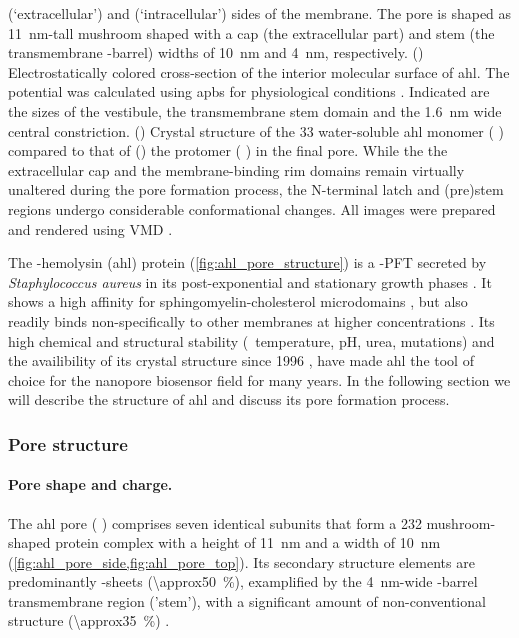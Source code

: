 \begin{figure*}[p]
{  \cisi{}  (`extracellular') and \transi{} (`intracellular') sides of the membrane. The pore is shaped as
  \SI{11}{\nm}-tall mushroom shaped with a cap (\ie the extracellular part) and stem (\ie the transmembrane
  \tb-barrel) widths of \SI{10}{\nm} and \SI{4}{\nm}, respectively.
  ()
  Electrostatically colored cross-section of the interior molecular surface of \gls{ahl}. The potential was
  calculated using \gls{apbs} for physiological conditions \cite{Baker-2001,Baker-2005}. Indicated are the
  sizes of the \cisi{} vestibule, the transmembrane stem domain and the \SI{1.6}{\nm} wide central
  constriction.
  ()
  Crystal structure of the \SI{33}{\kDa} water-soluble \gls{ahl} monomer ( \cite{Sugawara-2015})
  compared to that of
  ()
  the protomer ( \cite{Song-1996}) in the final pore. While the the extracellular cap and the
  membrane-binding rim domains remain virtually unaltered during the pore formation process, the N-terminal
  latch and (pre)stem regions undergo considerable conformational changes. 
  All images were prepared and rendered using VMD \cite{Humphrey-1996,Stone-1998}.
  }\label{fig:ahl_pore_structure}
\end{figure*}

The \textalpha-hemolysin (\gls{ahl}) protein (\cref{fig:ahl_pore_structure}) is a \tb-\gls{PFT} secreted by
\textit{Staphylococcus aureus} in its post-exponential and stationary growth phases \cite{Bhakdi-1991}. It
shows a high affinity for sphingomyelin-cholesterol microdomains \cite{Menestrina-2001,Valeva-2006}, but also
readily binds non-specifically to other membranes at higher concentrations \cite{Hildebrand-1991}. Its high
chemical and structural stability (\eg~temperature, pH, urea, mutations) and the availibility of its crystal
structure since 1996 \cite{Song-1996}, have made \gls{ahl} the tool of choice for the nanopore biosensor field
for many years. In the following section we will describe the structure of \gls{ahl} and discuss its pore
formation process.

\subsubsection{Pore structure}

\paragraph{Pore shape and charge.}
%
The \gls{ahl} pore ( \cite{Song-1996}) comprises seven identical subunits that form a
\SI{232}{\kDa} mushroom-shaped protein complex with a height of \SI{11}{\nm} and a width of \SI{10}{\nm}
(\cref{fig:ahl_pore_side,fig:ahl_pore_top}). Its secondary structure elements are predominantly \tb-sheets
(\SI{\approx50}{\percent}), examplified by the \SI{4}{\nm}-wide \tb-barrel transmembrane region ('stem'), with
a significant amount of non-conventional structure (\SI{\approx35}{\percent}) \cite{Song-1996}.

